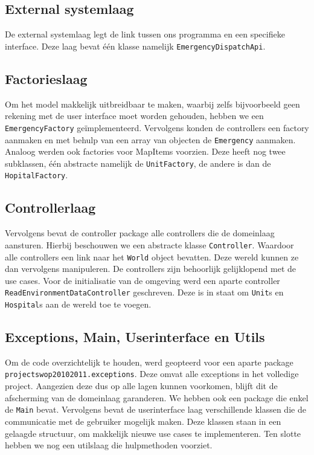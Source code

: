 \subsection{External systemlaag}
De external systemlaag legt de link tussen ons programma en een specifieke interface. Deze laag bevat \'e\'en klasse namelijk \texttt{EmergencyDispatchApi}.
\subsection{Factorieslaag}
Om het model makkelijk uitbreidbaar te maken, waarbij zelfs bijvoorbeeld geen rekening met de user interface moet worden gehouden, hebben we een \texttt{EmergencyFactory} ge\"implementeerd. Vervolgens konden de controllers een factory aanmaken en met behulp van een array van objecten de \texttt{Emergency} aanmaken. Analoog werden ook factories voor MapItems voorzien. Deze heeft nog twee subklassen, \'e\'en abstracte namelijk de \texttt{UnitFactory}, de andere is dan de \texttt{HopitalFactory}. 
\subsection{Controllerlaag}
Vervolgens bevat de controller package alle controllers die de domeinlaag aansturen. Hierbij beschouwen we een abstracte klasse \texttt{Controller}. Waardoor alle controllers een link naar het \texttt{World} object bevatten. Deze wereld kunnen ze dan vervolgens manipuleren. De controllers zijn behoorlijk gelijklopend met de use cases. Voor de initialisatie van de omgeving werd een aparte controller \texttt{ReadEnvironmentDataController} geschreven. Deze is in staat om \texttt{Unit}s en \texttt{Hospital}s aan de wereld toe te voegen.
\subsection{Exceptions, Main, Userinterface en Utils}
Om de code overzichtelijk te houden, werd geopteerd voor een aparte package \texttt{projectswop20102011.exceptions}. Deze omvat alle exceptions in het volledige project. Aangezien deze dus op alle lagen kunnen voorkomen, blijft dit de afscherming van de domeinlaag garanderen. We hebben ook een package die enkel de \texttt{Main} bevat. Vervolgens bevat de userinterface laag verschillende klassen die de communicatie met de gebruiker mogelijk maken. Deze klassen staan in een gelaagde structuur, om makkelijk nieuwe use cases te implementeren. Ten slotte hebben we nog een utilslaag die hulpmethoden voorziet.